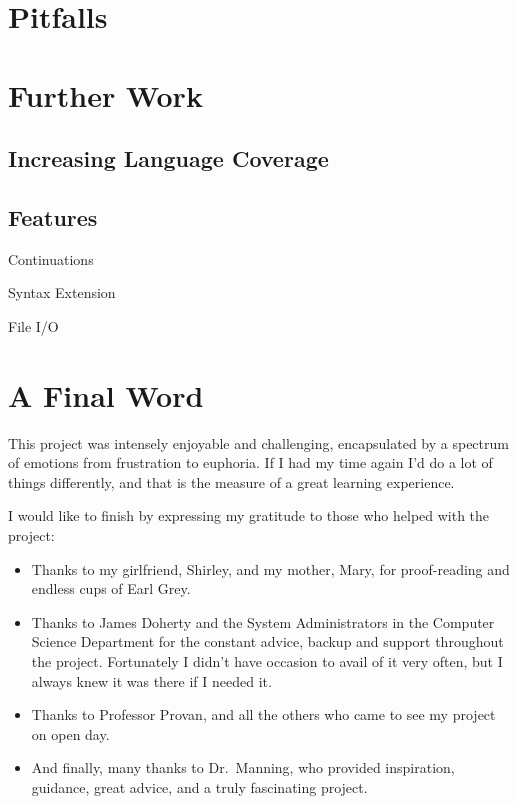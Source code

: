 \section{Pitfalls}


\section{Further Work}

\subsection{Increasing Language Coverage}

\subsection{Features}

Continuations

Syntax Extension

File I/O

\section{A Final Word}

This project was intensely enjoyable and challenging, encapsulated by a spectrum
of emotions from frustration to euphoria. If I had my time again I'd do a lot
of things differently, and that is the measure of a great learning experience.

I would like to finish by expressing my gratitude to those who helped with the
project:
\begin{itemize}
\item Thanks to my girlfriend, Shirley, and my mother, Mary, for proof-reading
and endless cups of Earl Grey.
\item Thanks to James Doherty and the System Administrators in the Computer
Science Department for the constant advice, backup and support throughout the
project. Fortunately I didn't have occasion to avail of it very often, but I
always knew it was there if I needed it.
\item Thanks to Professor Provan, and all the others who came to see my project
on open day.
\item And finally, many thanks to Dr.\ Manning, who provided inspiration,
guidance, great advice, and a truly fascinating project.
\end{itemize}
